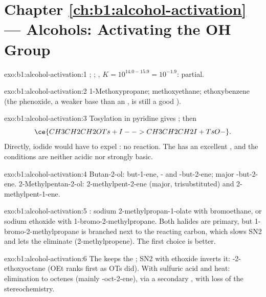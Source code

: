 \section*{Chapter \ref{ch:b1:alcohol-activation} --- Alcohols: Activating the OH Group}

\begin{solution}{exo:b1:alcohol-activation:1}
;
;
, $K = 10^{14.0 - 15.9} = 10^{-1.9}$:
partial.
\end{solution}

\begin{solution}{exo:b1:alcohol-activation:2}
1-Methoxypropane; methoxyethane; ethoxybenzene (the phenoxide, a weaker
base than an , is still a good ).
\end{solution}

\begin{solution}{exo:b1:alcohol-activation:3}
Tosylation in pyridine gives ; then
\[ \ce{CH3CH2CH2OTs + I- -> CH3CH2CH2I + TsO-}. \] Directly, iodide would have to
expel : no reaction. The  has an excellent ,
and the conditions are neither acidic nor strongly basic.
\end{solution}

\begin{solution}{exo:b1:alcohol-activation:4}
Butan-2-ol: but-1-ene, - and -but-2-ene; major
-but-2-ene. 2-Methylpentan-2-ol: 2-methylpent-2-ene (major,
trisubstituted) and 2-methylpent-1-ene.
\end{solution}

\begin{solution}{exo:b1:alcohol-activation:5}
: sodium 2-methylpropan-1-olate with bromoethane,
or sodium ethoxide with 1-bromo-2-methylpropane. Both halides are primary,
but 1-bromo-2-methylpropane is branched next to the reacting carbon,
which slows SN2 and lets the  eliminate (2-methylpropene). The
first choice is better.
\end{solution}

\begin{solution}{exo:b1:alcohol-activation:6}
The  keeps the  ; SN2 with ethoxide inverts
it: -2-ethoxyoctane (OEt ranks first as OTs did). With sulfuric acid
and heat: elimination to octenes (mainly -oct-2-ene), via a
secondary , with loss of the stereochemistry.
\end{solution}

